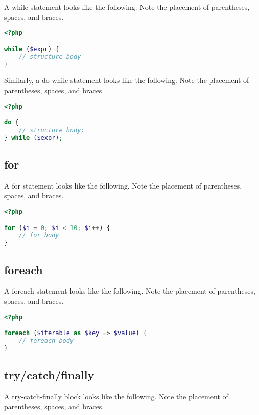 A while statement looks like the following. Note the placement of parentheses, spaces, and braces.



\begin{lstlisting}[language=PHP]
<?php

while ($expr) {
    // structure body
}
\end{lstlisting}

Similarly, a do while statement looks like the following. Note the placement of parentheses, spaces, and braces.






\begin{lstlisting}[language=PHP]
<?php

do {
    // structure body;
} while ($expr);
\end{lstlisting}



\subsection{for}

A for statement looks like the following. Note the placement of parentheses, spaces, and braces.




\begin{lstlisting}[language=PHP]
<?php

for ($i = 0; $i < 10; $i++) {
    // for body
}
\end{lstlisting}


\subsection{foreach}

A foreach statement looks like the following. Note the placement of parentheses, spaces, and braces.




\begin{lstlisting}[language=PHP]
<?php

foreach ($iterable as $key => $value) {
    // foreach body
}
\end{lstlisting}


\subsection{try/catch/finally}

A try-catch-finally block looks like the following. Note the placement of parentheses, spaces, and braces.




